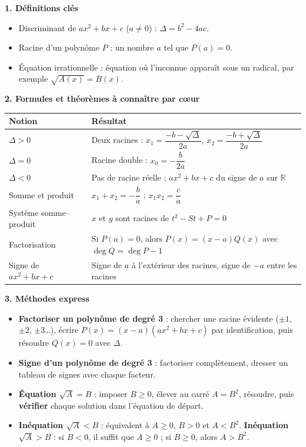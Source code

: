 \documentclass[11pt]{article}
\newcommand{\cle}[1]{{\popxbold\color{popdark}#1}}
\begin{document}
\begin{bilan}
\textbf{1. Définitions clés}
\begin{itemize}
  \item \cle{Discriminant} de $ax^2+bx+c$ ($a\neq 0$) : $\Delta=b^2-4ac$.
  \item \cle{Racine} d'un polynôme $P$ : un nombre $a$ tel que $P(a)=0$.
  \item \cle{Équation irrationnelle} : équation où l'inconnue apparaît sous un radical, par exemple $\sqrt{A(x)}=B(x)$.
\end{itemize}

\textbf{2. Formules et théorèmes à connaître par cœur}
\begin{center}
\begin{tabularx}{\linewidth}{|l|X|}
\hline
\rowcolor{popblueL} \textbf{Notion} & \textbf{Résultat} \\
\hline
$\Delta>0$ & Deux racines : $x_1=\dfrac{-b-\sqrt{\Delta}}{2a}$, $x_2=\dfrac{-b+\sqrt{\Delta}}{2a}$ \\
\hline
$\Delta=0$ & Racine double : $x_0=-\dfrac{b}{2a}$ \\
\hline
$\Delta<0$ & Pas de racine réelle ; $ax^2+bx+c$ du signe de $a$ sur $\mathbb{R}$ \\
\hline
Somme et produit & $x_1+x_2=-\dfrac{b}{a}$ ; $x_1x_2=\dfrac{c}{a}$ \\
\hline
Système somme--produit & $x$ et $y$ sont racines de $t^2-St+P=0$ \\
\hline
Factorisation & Si $P(a)=0$, alors $P(x)=(x-a)Q(x)$ avec $\deg Q=\deg P-1$ \\
\hline
Signe de $ax^2+bx+c$ & Signe de $a$ à l'extérieur des racines, signe de $-a$ entre les racines \\
\hline
\end{tabularx}
\end{center}

\textbf{3. Méthodes express}
\begin{itemize}
  \item \textbf{Factoriser un polynôme de degré 3} : chercher une racine évidente ($\pm1$, $\pm2$, $\pm3$\dots), écrire $P(x)=(x-a)(ax^2+bx+c)$ par identification, puis résoudre $Q(x)=0$ avec $\Delta$.
  \item \textbf{Signe d'un polynôme de degré 3} : factoriser complètement, dresser un tableau de signes avec chaque facteur.
  \item \textbf{Équation $\sqrt{A}=B$} : imposer $B\ge 0$, élever au carré $A=B^2$, résoudre, puis \textbf{vérifier} chaque solution dans l'équation de départ.
  \item \textbf{Inéquation $\sqrt{A}<B$} : équivalent à $A\ge 0$, $B>0$ et $A<B^2$. \textbf{Inéquation $\sqrt{A}>B$} : si $B<0$, il suffit que $A\ge 0$ ; si $B\ge 0$, alors $A>B^2$.
\end{itemize}
\end{bilan}
\end{document}
